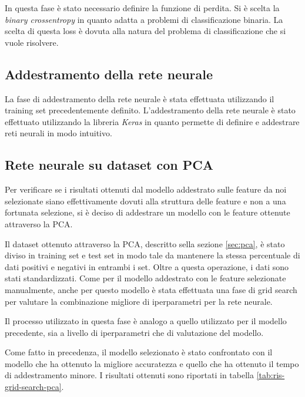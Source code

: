 In questa fase è stato necessario definire la funzione di perdita. Si è scelta
la \textit{binary crossentropy} in quanto adatta a problemi di classificazione
binaria. La scelta di questa loss è dovuta alla natura del problema di
classificazione che si vuole risolvere.
\subsection{Addestramento della rete neurale}
La fase di addestramento della rete neurale è stata effettuata utilizzando il
training set precedentemente definito. L'addestramento della rete neurale è stato
effettuato utilizzando la libreria \textit{Keras} in quanto permette di definire
e addestrare reti neurali in modo intuitivo.
\subsection{Rete neurale su dataset con PCA}
Per verificare se i risultati ottenuti dal modello addestrato sulle feature da
noi selezionate siano effettivamente dovuti alla struttura delle feature e non
a una fortunata selezione, si è deciso di addestrare un modello con le feature
ottenute attraverso la PCA.

Il dataset ottenuto attraverso la PCA, descritto sella sezione \ref{sec:pca}, è
stato diviso in training set e test set in modo tale da mantenere la stessa
percentuale di dati positivi e negativi in entrambi i set. Oltre a questa
operazione, i dati sono stati standardizzati.
Come per il modello addestrato con le feature selezionate manualmente, anche per
questo modello è stata effettuata una fase di grid search per valutare la
combinazione migliore di iperparametri per la rete neurale.

Il processo utilizzato in questa fase è analogo a quello utilizzato per il modello
precedente, sia a livello di iperparametri che di valutazione del modello.

Come fatto in precedenza, il modello selezionato è stato confrontato con il modello
che ha ottenuto la migliore accuratezza e quello che ha ottenuto il tempo di
addestramento minore. I risultati ottenuti sono riportati in tabella \ref{tab:ris-grid-search-pca}.

